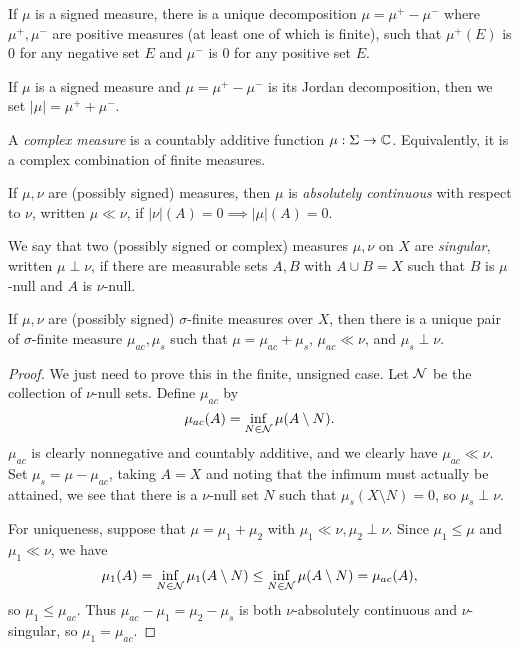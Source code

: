 \documentclass[letterpaper,11pt]{report}
\begin{document}
\begin{thm} If $\mu$ is a signed measure, there is a unique decomposition $\mu = \mu^+ - \mu^-$ where $\mu^+, \mu^-$ are positive measures (at least one of which is finite), such that $\mu^+(E)$ is $0$ for any negative set $E$ and $\mu^-$ is $0$ for any positive set $E$.
\end{thm}

\begin{defn} If $\mu$ is a signed measure and $\mu = \mu^+ - \mu^-$ is its Jordan decomposition, then we set $|\mu| = \mu^+ + \mu^-$.
\end{defn}

\begin{defn} A \emph{complex measure} is a countably additive function $\mu:\Sigma \rightarrow \mathbb{C}$. Equivalently, it is a complex combination of finite measures.
\end{defn}

\begin{defn} If $\mu, \nu$ are (possibly signed) measures, then $\mu$ is \emph{absolutely continuous} with respect to $\nu$, written $\mu \ll \nu$, if $|\nu|(A) = 0 \implies |\mu|(A) = 0$.
\end{defn}

\begin{defn} We say that two (possibly signed or complex) measures $\mu,\nu$ on $X$ are \emph{singular}, written $\mu \perp \nu$, if there are measurable sets $A,B$ with $A \cup B = X$ such that $B$ is $\mu$-null and $A$ is $\nu$-null.
\end{defn}

\begin{thm} If $\mu, \nu$ are (possibly signed) $\sigma$-finite measures over $X$, then there is a unique pair of $\sigma$-finite measure $\mu_{ac}, \mu_s$ such that $\mu = \mu_{ac} + \mu_s$, $\mu_{ac} \ll \nu$, and $\mu_s \perp \nu$.
\end{thm}
\begin{proof} We just need to prove this in the finite, unsigned case. Let $\mathcal{N}$ be the collection of $\nu$-null sets. Define $\mu_{ac}$ by
\[
\mu_{ac}(A) = \inf_{N \in \mathcal{N}} \mu(A\setminus N).
\]
$\mu_{ac}$ is clearly nonnegative and countably additive, and we clearly have $\mu_{ac} \ll \nu$. Set $\mu_s = \mu - \mu_{ac}$, taking $A = X$ and noting that the infimum must actually be attained, we see that there is a $\nu$-null set $N$ such that $\mu_s(X\setminus N) = 0$, so $\mu_s \perp \nu$.

For uniqueness, suppose that $\mu = \mu_1 + \mu_2$ with $\mu_1 \ll \nu, \mu_2 \perp \nu$. Since $\mu_1 \le \mu$ and $\mu_1 \ll \nu$, we have
\[
\mu_1(A) = \inf_{N \in \mathcal{N}} \mu_1(A\setminus N) \le \inf_{N \in \mathcal{N}} \mu(A\setminus N) = \mu_{ac}(A),
\]
so $\mu_1 \le \mu_{ac}$. Thus $\mu_{ac} - \mu_1 = \mu_2 - \mu_s$ is both $\nu$-absolutely continuous and $\nu$-singular, so $\mu_1 = \mu_{ac}$.
\end{proof}
\end{document}
